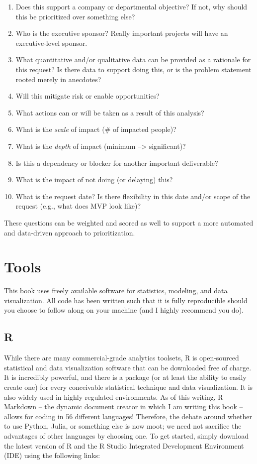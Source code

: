 \documentclass[]{book}
\providecommand{\tightlist}{%
  \setlength{\itemsep}{0pt}\setlength{\parskip}{0pt}}
\begin{document}
\begin{enumerate}
\def\labelenumi{\arabic{enumi}.}
\tightlist
\item
  Does this support a company or departmental objective? If not, why should this be prioritized over something else?
\item
  Who is the executive sponsor? Really important projects will have an executive-level sponsor.
\item
  What quantitative and/or qualitative data can be provided as a rationale for this request? Is there data to support doing this, or is the problem statement rooted merely in anecdotes?
\item
  Will this mitigate risk or enable opportunities?
\item
  What actions can or will be taken as a result of this analysis?
\item
  What is the \emph{scale} of impact (\# of impacted people)?
\item
  What is the \emph{depth} of impact (minimum --\textgreater{} significant)?
\item
  Is this a dependency or blocker for another important deliverable?
\item
  What is the impact of not doing (or delaying) this?
\item
  What is the request date? Is there flexibility in this date and/or scope of the request (e.g., what does MVP look like)?
\end{enumerate}

These questions can be weighted and scored as well to support a more automated and data-driven approach to prioritization.

\hypertarget{tools}{%
\section{Tools}\label{tools}}

This book uses freely available software for statistics, modeling, and data visualization. All code has been written such that it is fully reproducible should you choose to follow along on your machine (and I highly recommend you do).

\hypertarget{r}{%
\subsection{R}\label{r}}

While there are many commercial-grade analytics toolsets, R is open-sourced statistical and data visualization software that can be downloaded free of charge. It is incredibly powerful, and there is a package (or at least the ability to easily create one) for every conceivable statistical technique and data visualization. It is also widely used in highly regulated environments. As of this writing, R Markdown -- the dynamic document creator in which I am writing this book -- allows for coding in 56 different languages! Therefore, the debate around whether to use Python, Julia, or something else is now moot; we need not sacrifice the advantages of other languages by choosing one. To get started, simply download the latest version of R and the R Studio Integrated Development Environment (IDE) using the following links:
\end{document}
